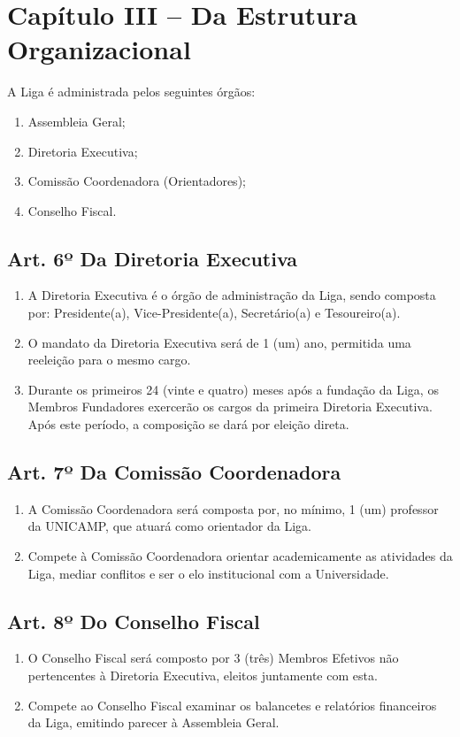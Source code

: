 \documentclass[12pt, a4paper]{article}
\begin{document}
\section{Capítulo III – Da Estrutura Organizacional}


A Liga é administrada pelos seguintes órgãos:
\begin{enumerate}[label=\alph*)]
    \item Assembleia Geral;
    \item Diretoria Executiva;
    \item Comissão Coordenadora (Orientadores);
    \item Conselho Fiscal.
\end{enumerate}

\subsection{Art. 6º Da Diretoria Executiva}
\begin{enumerate}[label=\S \arabic*.]
    \item A Diretoria Executiva é o órgão de administração da Liga, sendo composta por: Presidente(a), Vice-Presidente(a), Secretário(a) e Tesoureiro(a).
    \item O mandato da Diretoria Executiva será de 1 (um) ano, permitida uma reeleição para o mesmo cargo.
    \item Durante os primeiros 24 (vinte e quatro) meses após a fundação da Liga, os Membros Fundadores exercerão os cargos da primeira Diretoria Executiva. Após este período, a composição se dará por eleição direta.
\end{enumerate}

\subsection{Art. 7º Da Comissão Coordenadora}
\begin{enumerate}[label=\S \arabic*.]
    \item A Comissão Coordenadora será composta por, no mínimo, 1 (um) professor da UNICAMP, que atuará como orientador da Liga.
    \item Compete à Comissão Coordenadora orientar academicamente as atividades da Liga, mediar conflitos e ser o elo institucional com a Universidade.
\end{enumerate}

\subsection{Art. 8º Do Conselho Fiscal}
\begin{enumerate}[label=\S \arabic*.]
    \item O Conselho Fiscal será composto por 3 (três) Membros Efetivos não pertencentes à Diretoria Executiva, eleitos juntamente com esta.
    \item Compete ao Conselho Fiscal examinar os balancetes e relatórios financeiros da Liga, emitindo parecer à Assembleia Geral.
\end{enumerate}
\end{document}
